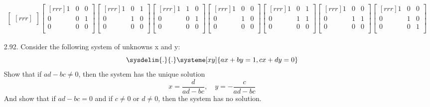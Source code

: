\documentclass[12pt]{article}
\begin{document}
\begin{enumerate}
\begin{align*}
\begin{bmatrix}[rrr]
\end{bmatrix}
\begin{bmatrix}[rrr]
1 & 0 & 0\\
0 & 0 & 1\\
0 & 0 & 0\\
\end{bmatrix}
\begin{bmatrix}[rrr]
1 & 0 & 1\\
0 & 1 & 0\\
0 & 0 & 0\\
\end{bmatrix}
\begin{bmatrix}[rrr]
1 & 1 & 0\\
0 & 0 & 1\\
0 & 0 & 0\\
\end{bmatrix}
\begin{bmatrix}[rrr]
1 & 0 & 0\\
0 & 1 & 0\\
0 & 0 & 0\\
\end{bmatrix}
\begin{bmatrix}[rrr]
1 & 0 & 1\\
0 & 1 & 1\\
0 & 0 & 0\\
\end{bmatrix}
\begin{bmatrix}[rrr]
1 & 0 & 0\\
0 & 1 & 1\\
0 & 0 & 0\\
\end{bmatrix}
\begin{bmatrix}[rrr]
1 & 0 & 0\\
0 & 1 & 0\\
0 & 0 & 1\\
\end{bmatrix}
\end{align*}

\pagebreak
\item [2.92.] Consider the following system of unknowns x and y:
\[ \sysdelim{.}{.}\systeme[xy]{ax+by=1,cx+dy=0} \]
Show that if $ad-bc \neq 0$, then the system has the unique solution
\[ x=\frac{d}{ad-bc}, \quad y=-\frac{c}{ad-bc} \]
And show that if $ad-bc=0$ and if $c \neq 0$ or $d \neq 0$, then the system has no solution.


\end{enumerate}
\end{document}
